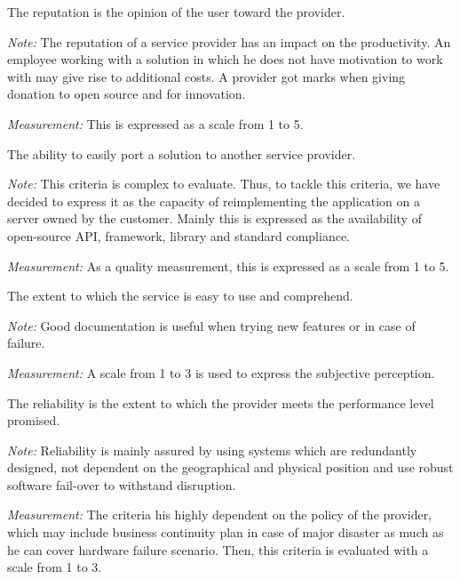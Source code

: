 \documentclass[a4paper,11pt]{article}
\begin{document}
\begin{description}[parsep=10pt,listparindent=\parindent,labelindent=\parindent,font=$\bullet$\ ]
  \item[Reputation:] The reputation is the opinion of the user toward the provider.
    \par \emph{Note:} The reputation of a service provider has an impact on the productivity. An employee working with a solution in which he does not have motivation to work with may give rise to additional costs. A provider got marks when giving donation to open source and for innovation.
    \par \emph{Measurement:} This is expressed as a scale from 1 to 5.
    
  \item[Portability:] The ability to easily port a solution to another service provider.
    \par \emph{Note:} This criteria is complex to evaluate. Thus, to tackle this criteria, we have decided to express it as the capacity of reimplementing the application on a server owned by the customer. Mainly this is expressed as the availability of open-source API, framework, library and standard compliance.
    \par \emph{Measurement:} As a quality measurement, this is expressed as a scale from 1 to 5.

  \item[Usability:] The extent to which the service is easy to use and comprehend.
    \par \emph{Note:} Good documentation is useful when trying new features or in case of failure.
    \par \emph{Measurement:} A scale from 1 to 3 is used to express the subjective perception.

  \item[Reliability:] The reliability is the extent to which the provider meets the performance level promised.
    \par \emph{Note:} Reliability is mainly assured by using systems which are redundantly designed, not dependent on the geographical and physical position and use robust software fail-over to withstand disruption.
    \par \emph{Measurement:} The criteria his highly dependent on the policy of the provider, which may include business continuity plan in case of major disaster as much as he can cover hardware failure scenario. Then, this criteria is evaluated with a scale from 1 to 3.


\end{description}
\end{document}
